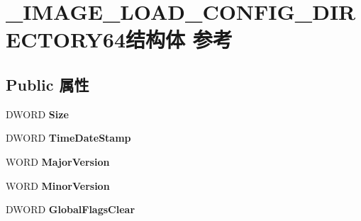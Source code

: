 \hypertarget{struct___i_m_a_g_e___l_o_a_d___c_o_n_f_i_g___d_i_r_e_c_t_o_r_y64}{}\section{\+\_\+\+I\+M\+A\+G\+E\+\_\+\+L\+O\+A\+D\+\_\+\+C\+O\+N\+F\+I\+G\+\_\+\+D\+I\+R\+E\+C\+T\+O\+R\+Y64结构体 参考}
\label{struct___i_m_a_g_e___l_o_a_d___c_o_n_f_i_g___d_i_r_e_c_t_o_r_y64}
\subsection*{Public 属性}
\begin{DoxyCompactItemize}
\item 
\mbox{\label{struct___i_m_a_g_e___l_o_a_d___c_o_n_f_i_g___d_i_r_e_c_t_o_r_y64_a2cf30826c2620ee057cb6afe67feeaec}} 
D\+W\+O\+RD {\bfseries Size}
\item 
\mbox{\label{struct___i_m_a_g_e___l_o_a_d___c_o_n_f_i_g___d_i_r_e_c_t_o_r_y64_a633c67681908a196aac40dc6c7a82fb8}} 
D\+W\+O\+RD {\bfseries Time\+Date\+Stamp}
\item 
\mbox{\label{struct___i_m_a_g_e___l_o_a_d___c_o_n_f_i_g___d_i_r_e_c_t_o_r_y64_aa2aa2c656b9f1735a82b44163d9b13d4}} 
W\+O\+RD {\bfseries Major\+Version}
\item 
\mbox{\label{struct___i_m_a_g_e___l_o_a_d___c_o_n_f_i_g___d_i_r_e_c_t_o_r_y64_a667511e764f5043190a8d656549d179a}} 
W\+O\+RD {\bfseries Minor\+Version}
\item 
\mbox{\label{struct___i_m_a_g_e___l_o_a_d___c_o_n_f_i_g___d_i_r_e_c_t_o_r_y64_acb112a6a262b57f070bdd11cfcb81a93}} 
D\+W\+O\+RD {\bfseries Global\+Flags\+Clear}
\item 
\mbox{\label{struct___i_m_a_g_e___l_o_a_d___c_o_n_f_i_g___d_i_r_e_c_t_o_r_y64_a4d52a98d467c64334306bb258c16ce6e}} 

\end{DoxyCompactItemize}
